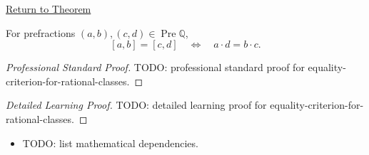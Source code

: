 \newpage
{}
\label{prf:equality-criterion-for-rational-classes}

\begin{remark*}[Return]
\hyperref[prop:equality-criterion-for-rational-classes]{Return to Theorem}
\end{remark*}

\begin{proposition*}
For prefractions $(a,b),(c,d)\in\operatorname{Pre}\mathbb{Q}$,
\[
[a,b]=[c,d]
\quad\Longleftrightarrow\quad
a\cdot d=b\cdot c.
\]
\end{proposition*}

\begin{proof}[Professional Standard Proof]
\LRAProofBodyStart
TODO: professional standard proof for equality-criterion-for-rational-classes.
\end{proof}

\begin{proof}[Detailed Learning Proof]
\LRAProofBodyStart
TODO: detailed learning proof for equality-criterion-for-rational-classes.
\end{proof}

\begin{remark*}
\end{remark*}

\begin{dependencies}
\begin{itemize}
  \item TODO: list mathematical dependencies.
\end{itemize}
\end{dependencies}

\clearpage
